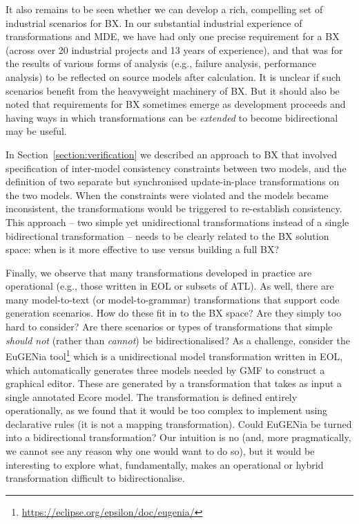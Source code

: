 It also remains to be seen whether we can develop a rich, compelling set of industrial scenarios for BX. In our substantial industrial experience of transformations and MDE, we have had only one precise requirement for a BX (across over 20 industrial projects and 13 years of experience), and that was for the results of various forms of analysis (e.g., failure analysis, performance analysis) to be reflected on source models after calculation. It is unclear if such scenarios benefit from the heavyweight machinery of BX. But it should also be noted that requirements for BX sometimes emerge as development proceeds and having ways in which transformations can be \textit{extended} to become bidirectional may be useful.

In Section~\ref{section:verification} we described an approach to BX that involved specification of inter-model consistency constraints between two models, and the definition of two separate but synchronised update-in-place transformations on the two models. When the constraints were violated and the models became inconsistent, the transformations would be triggered to re-establish consistency. This approach -- two simple yet unidirectional transformations instead of a single bidirectional transformation -- needs to be clearly related to the BX solution space: when is it more effective to use versus building a full BX?

Finally, we observe that many transformations developed in practice are operational (e.g., those written in EOL or subsets of ATL). As well, there are many model-to-text (or model-to-grammar) transformations that support code generation scenarios. How do these fit in to the BX space? Are they simply too hard to consider? Are there scenarios or types of transformations that simple \textit{should not} (rather than \textit{cannot}) be bidirectionalised? As a challenge, consider the EuGENia tool\footnote{\url{https://eclipse.org/epsilon/doc/eugenia/}} which is a unidirectional model transformation written in EOL, which automatically generates three models needed by GMF to construct a graphical editor. These are generated by a transformation that takes as input a single annotated Ecore model. The transformation is defined entirely operationally, as we found that it would be too complex to implement using declarative rules (it is not a mapping transformation). Could EuGENia be turned into a bidirectional transformation? Our intuition is no (and, more pragmatically, we cannot see any reason why one would want to do so), but it would be interesting to explore what, fundamentally, makes an operational or hybrid transformation difficult to bidirectionalise.

